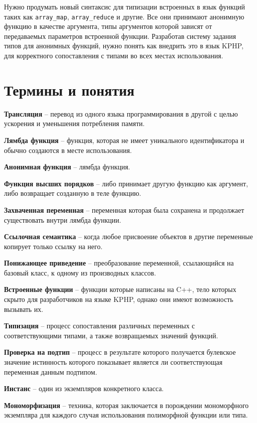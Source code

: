 Нужно продумать новый синтаксис для типизации встроенных в язык функций таких как \verb|array_map|, \verb|array_reduce| и другие. Все они принимают анонимную функцию в качестве аргумента, типы аргументов которой зависят от передаваемых параметров встроенной функции. Разработав систему задания типов для анонимных функций, нужно понять как внедрить это в язык KPHP, для корректного сопоставления с типами во всех местах использования.

\section{Термины и понятия}
\textbf{Трансляция} -- перевод из одного языка программирования в другой с целью ускорения и уменьшения потребления памяти.

\textbf{Лямбда функция} -- функция, которая не имеет уникального идентификатора и обычно создаются в месте использования.

\textbf{Анонимная функция} -- лямбда функция.

\textbf{Функция высших порядков} -- либо принимает другую функцию как аргумент, либо возвращает созданную в теле функцию.

\textbf{Захваченная переменная} -- переменная которая была сохранена и продолжает существовать внутри лямбда функции.

\textbf{Ссылочная семантика} -- когда любое присвоение объектов в другие переменные копирует только ссылку на него.

\textbf{Понижающее приведение} -- преобразование переменной, ссылающийся на базовый класс, к одному из производных классов.

\textbf{Встроенные функции} -- функции которые написаны на C++, тело которых скрыто для разработчиков на языке KPHP, однако они имеют возможность вызывать их.

\textbf{Типизация} -- процесс сопоставления различных переменных с соответствующими типами, а также возвращаемых значений функций.

\textbf{Проверка на подтип} -- процесс в результате которого получается булевское значение истинность которого показывает является ли соответствующая переменная данным подтипом.

\textbf{Инстанс} -- один из экземпляров конкретного класса.

\textbf{Мономорфизация} -- техника, которая заключается в порождении мономорфного экземпляра для каждого случая использования полиморфной функции или типа.

